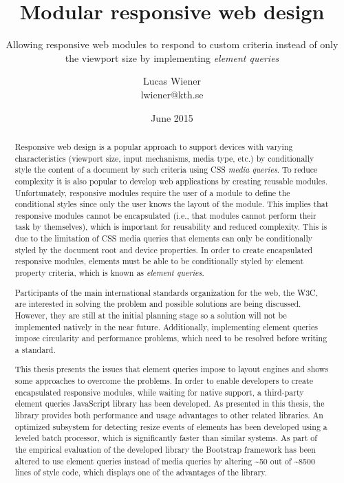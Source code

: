 \documentclass[a4paper,11pt]{kth-mag}
\title{Modular responsive web design}
\subtitle{Allowing responsive web modules to respond to custom criteria instead of only the viewport size by implementing \emph{element queries}}
\author{Lucas Wiener \\ \lowercase{lwiener@kth.se}}
\date{June 2015}
\begin{document}
  \frontmatter
  \pagestyle{empty}
  \removepagenumbers
  \maketitle
  \begin{abstract}
    Responsive web design is a popular approach to support devices with varying characteristics (viewport size, input mechanisms, media type, etc.) by conditionally style the content of a document by such criteria using CSS \emph{media queries}.
    To reduce complexity it is also popular to develop web applications by creating reusable modules.
    Unfortunately, responsive modules require the user of a module to define the conditional styles since only the user knows the layout of the module.
    This implies that responsive modules cannot be encapsulated (i.e., that modules cannot perform their task by themselves), which is important for reusability and reduced complexity.
    This is due to the limitation of CSS media queries that elements can only be conditionally styled by the document root and device properties.
    In order to create encapsulated responsive modules, elements must be able to be conditionally styled by element property criteria, which is known as \emph{element queries}.

    Participants of the main international standards organization for the web, the W3C, are interested in solving the problem and possible solutions are being discussed.
    However, they are still at the initial planning stage so a solution will not be implemented natively in the near future.
    Additionally, implementing element queries impose circularity and performance problems, which need to be resolved before writing a standard.

    This thesis presents the issues that element queries impose to layout engines and shows some approaches to overcome the problems.
    In order to enable developers to create encapsulated responsive modules, while waiting for native support, a third-party element queries JavaScript library has been developed.
    As presented in this thesis, the library provides both performance and usage advantages to other related libraries.
    An optimized subsystem for detecting resize events of elements has been developed using a leveled batch processor, which is significantly faster than similar systems.
    As part of the empirical evaluation of the developed library the Bootstrap framework has been altered to use element queries instead of media queries by altering \textasciitilde50 out of \textasciitilde8500 lines of style code, which displays one of the advantages of the library.

  \end{abstract}
\end{document}
